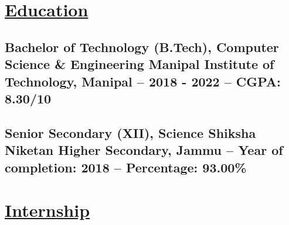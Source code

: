 \documentclass{article}
\makeatletter
\renewcommand{\maketitle}{
    \begin{flushleft}        
        {\huge\rmfamily
        \theauthor}\newline
        \vspace{0.1em}
        \textit{Mail: sahilsainisalaria@gmail.com }  \newline  
        \textit{ Github: github.com/Sahil1515 }  \newline 
        \textit{ Contact: +91 9682663655 }  \newline 
        \textit{ Address: Jammu, Jammu \& Kashmir }  \newline 
        }  \newline
\makeatother
\begin{document}


\section{\underline{Education}}

    \subsection{\textbf{Bachelor of Technology (B.Tech), Computer Science \& Engineering}\newline 
    \textmd{Manipal Institute of Technology, Manipal --  2018 - 2022 -- CGPA: 8.30/10}}
    
    \subsection{\textbf{Senior Secondary (XII), Science}\newline 
    \textmd{ Shiksha Niketan Higher Secondary, Jammu -- Year of completion: 2018 --  Percentage: 93.00\%}}
    
   
\section{\underline{Internship}}
\end{document}
